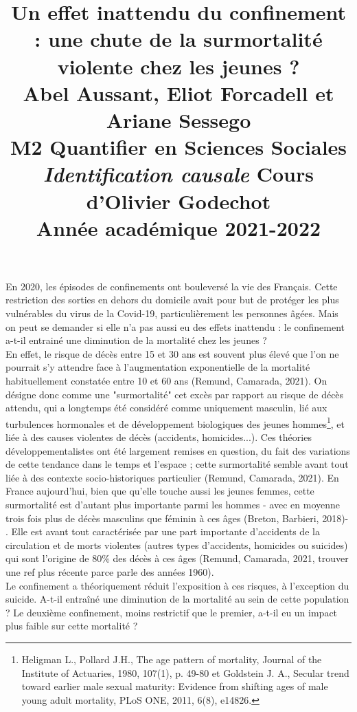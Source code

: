 \documentclass{article}
\title{\centering 

\vspace{1 cm}

{\begin{minipage}\linewidth
        \centering
     \textbf{ Un effet inattendu du confinement : une chute de la surmortalité violente chez les jeunes ?} \\[1 cm] 
        \vspace{0.5cm}
        \large Abel Aussant, Eliot Forcadell et Ariane Sessego\\
         M2 Quantifier en Sciences Sociales\\
        \vspace{0.5cm}
         \textit{Identification causale} Cours d'Olivier Godechot \\
         Année académique 2021-2022\\
    \end{minipage}}
  }
\date{}
\begin{document}

\maketitle

\cleardoublepage%

En 2020, les épisodes de confinements ont bouleversé la vie des Français. Cette restriction des sorties en dehors du domicile avait pour but de protéger les plus vulnérables du virus de la Covid-19, particulièrement les personnes âgées. Mais on peut se demander si elle n'a pas aussi eu des effets inattendu : le confinement a-t-il entrainé une diminution de la mortalité chez les jeunes ? \\

En effet, le risque de décès entre 15 et 30 ans est souvent plus élevé que l'on ne pourrait s'y attendre face à l'augmentation exponentielle de la mortalité habituellement constatée entre 10 et 60 ans (Remund, Camarada, 2021). On désigne donc comme une "surmortalité" cet excès par rapport au risque de décès attendu, qui a longtemps été considéré comme uniquement masculin, lié aux turbulences hormonales et de développement biologiques des jeunes hommes\footnote{Heligman L., Pollard J.H., The age pattern of mortality, Journal of the Institute of Actuaries, 1980, 107(1), p. 49-80 et  Goldstein J. A., Secular trend toward earlier male sexual maturity: Evidence from shifting ages of male young adult mortality, PLoS ONE, 2011, 6(8), e14826.}, et liée à des causes violentes de décès (accidents, homicides...). Ces théories développementalistes ont été largement remises en question, du fait des variations de cette tendance dans le temps et l'espace ; cette surmortalité semble avant tout liée à des contexte socio-historiques particulier (Remund, Camarada, 2021). En France aujourd'hui, bien que qu'elle touche aussi les jeunes femmes, cette surmortalité est d'autant plus importante parmi les hommes - avec en moyenne trois fois plus de décès masculins que féminin à ces âges (Breton, Barbieri, 2018)- . Elle est avant tout caractérisée par une part importante d'accidents de la circulation et de morts violentes (autres types d'accidents, homicides ou suicides) qui sont l'origine de 80\% des décès à ces âges (Remund, Camarada, 2021, trouver une ref plus récente parce parle des années 1960). \\

Le confinement a théoriquement réduit l'exposition à ces risques, à l'exception du suicide. A-t-il entraîné une diminution de la mortalité au sein de cette population ? Le deuxième confinement, moins restrictif que le premier, a-t-il eu un impact plus faible sur cette mortalité ? \\
\end{document}
